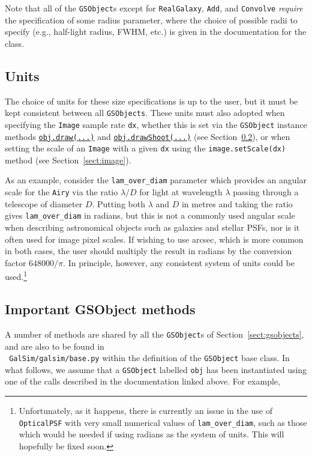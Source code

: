 \documentclass[preprint,11pt]{aastex}
\begin{document}
Note that all of the \texttt{GSObject}s except for \texttt{RealGalaxy}, \texttt{Add}, and
\texttt{Convolve} {\em require} the specification of some radius parameter, where the choice of
possible radii to specify (e.g., half-light radius, FWHM, etc.) is given in the documentation for
the class.

\subsection{Units}
The choice of units for these size specifications is up to the user,
but it must be kept consistent between all \texttt{GSObjects}.  These
units must also adopted when specifying the \texttt{Image} sample
rate \texttt{dx}, whether this is set via the \texttt{GSObject}
instance methods \href{http://galsim-developers.github.com/GalSim/classgalsim_1_1base_1_1_g_s_object.html#ae0b346a8b438dedbc7f60a52220869d8}{\texttt{obj.draw(...)}}
and
\href{http://galsim-developers.github.com/GalSim/classgalsim_1_1base_1_1_g_s_object.html#a42ac334d2840ba3fa832988e998beca0}{\texttt{obj.drawShoot(...)}}
(see Section~\ref{sect:gsobjectmethods}),
or when setting the scale of an \texttt{Image} with a given
\texttt{dx} using the \texttt{image.setScale(dx)} method (see Section~\ref{sect:image}).

As an example, consider the
\texttt{lam\_over\_diam} parameter which provides an angular scale for
the \texttt{Airy} via
the ratio $\lambda / D$ for light at wavelength $\lambda$ passing
through a telescope of diameter $D$. Putting both $\lambda$ and
$D$ in metres and taking the ratio gives \texttt{lam\_over\_diam} in
radians, but this is not a commonly used angular scale when describing
astronomical objects such as galaxies and stellar PSFs, nor is
it often used for image pixel scales.  If wishing to use arcsec, which
is more common in both cases, the user should multiply the result in
radians by the conversion factor
$648000 / \pi$.  In principle, however, any consistent
system of units could be used.\footnote{Unfortunately, as it happens, there is
  currently an issue in the use of \texttt{OpticalPSF} with very small
  numerical values
  of \texttt{lam\_over\_diam}, such as those which would be needed if using
  radians as the system of units.  This will hopefully be fixed soon.}


\subsection{Important GSObject methods}\label{sect:gsobjectmethods}
A number of methods are shared by all the \texttt{GSObject}s of
Section~\ref{sect:gsobjects}, and are also to be found in \\ {\tt
  GalSim/galsim/base.py} within the definition of the
\texttt{GSObject} base class.  In what follows, we assume that a
\texttt{GSObject} labelled \texttt{obj} has been instantiated using
one of the calls described in the documentation linked above.  For
example,
\end{document}
